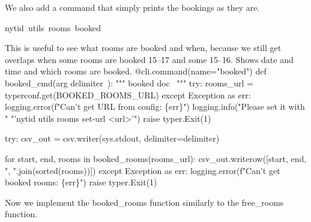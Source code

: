 We also add a command that simply prints the bookings as they are.
\begin{center}
{\Tt{}nytid\ utils\ rooms\ booked\nwendquote}
\end{center}
This is useful to see what rooms are booked and when, because we still get 
overlaps when some rooms are booked 15--17 and some 15--16.
\nwenddocs{}\endmoddef\nwstartdeflinemarkup{}\nwenddeflinemarkup
Shows date and time and which rooms are booked.
\nwendcode{}\plusendmoddef\nwstartdeflinemarkup{}\nwenddeflinemarkup
@cli.command(name="booked")
def booked_cmd(\LA{}arg \code{}delimiter\edoc{}~{\nwtagstyle{}}\RA{}):
  """
  \LA{}\code{}booked\edoc{} doc~{\nwtagstyle{}}\RA{}
  """
  try:
    rooms_url = typerconf.get(BOOKED_ROOMS_URL)
  except Exception as err:
    logging.error(f"Can't get URL from config: \{err\}")
    logging.info("Please set it with "
                 "'nytid utils rooms set-url <url>'")
    raise typer.Exit(1)

  try:
    csv_out = csv.writer(sys.stdout, delimiter=delimiter)

    for start, end, rooms in booked_rooms(rooms_url):
      csv_out.writerow([start, end, ", ".join(sorted(rooms))])
  except Exception as err:
    logging.error(f"Can't get booked rooms: \{err\}")
    raise typer.Exit(1)
\nwendcode{}\nwdocspar

Now we implement the {\Tt{}booked{\_}rooms\nwendquote} function similarly to the {\Tt{}free{\_}rooms\nwendquote} 
function.
\nwenddocs{}

